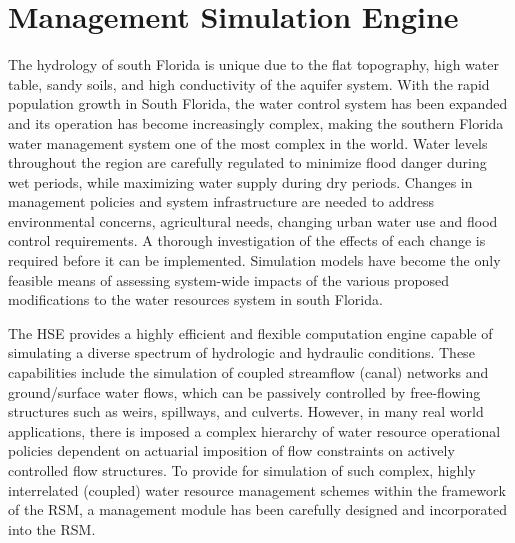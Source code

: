  \chapter{Management Simulation Engine}\label{Chapter:ManagementSimulationEngine}

The hydrology of south Florida is unique due to the flat topography,
high water table, sandy soils, and high conductivity of the aquifer
system. With the rapid population growth in South Florida, the water
control system has been expanded and its operation has become
increasingly complex, making the southern Florida water management
system one of the most complex in the world.  Water levels throughout
the region are carefully regulated to minimize flood danger during wet
periods, while maximizing water supply during dry periods.  Changes in
management policies and system infrastructure are needed to address
environmental concerns, agricultural needs, changing urban water use
and flood control requirements.  A thorough investigation of the
effects of each change is required before it can be implemented.
Simulation models have become the only feasible means of assessing
system-wide impacts of the various proposed modifications to the water
resources system in south Florida.

The HSE provides a highly efficient and flexible computation engine
capable of simulating a diverse spectrum of hydrologic and hydraulic
conditions. These capabilities include the simulation of coupled
streamflow (canal) networks and ground/surface water flows, which can
be passively controlled by free-flowing structures such as weirs,
spillways, and culverts.  However, in many real world applications,
there is imposed a complex hierarchy of water resource operational
policies dependent on actuarial imposition of flow constraints on
actively controlled flow structures. To provide for simulation of such
complex, highly interrelated (coupled) water resource management
schemes within the framework of the RSM, a management module has been
carefully designed and incorporated into the RSM.

